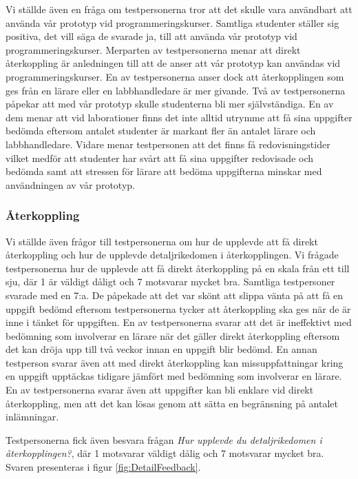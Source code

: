 \documentclass[a4paper,11pt]{article}
\begin{document}
{Vi ställde även en fråga om testpersonerna tror att det skulle vara användbart att använda vår prototyp vid programmeringskurser. Samtliga studenter ställer sig positiva, det vill säga de svarade ja, till att använda vår prototyp vid programmeringskurser. Merparten av testpersonerna menar att direkt återkoppling är anledningen till att de anser att vår prototyp kan användas vid programmeringskurser. En av testpersonerna anser dock att återkopplingen som ges från en lärare eller en labbhandledare är mer givande. Två av testpersonerna påpekar att med vår prototyp skulle studenterna bli mer självständiga. En av dem menar att vid laborationer finns det inte alltid utrymme att få sina uppgifter bedömda eftersom antalet studenter är markant fler än antalet lärare och labbhandledare. Vidare menar testpersonen att det finns få redovisningstider vilket medför att studenter har svårt att få sina uppgifter redovisade och bedömda samt att stressen för lärare att bedöma uppgifterna minskar med användningen av vår prototyp.

\subsubsection{Återkoppling}\label{Återkoppling}

Vi ställde även frågor till testpersonerna om hur de upplevde att få direkt återkoppling och hur de upplevde detaljrikedomen i återkopplingen. Vi frågade testpersonerna hur de upplevde att få direkt återkoppling på en skala från ett till sju, där 1 är väldigt dåligt och 7 motsvarar mycket bra.
Samtliga testpersoner svarade med en 7:a. De påpekade att det var skönt att slippa vänta på att få en uppgift bedömd eftersom testpersonerna tycker att återkoppling ska ges när de är inne i tänket för uppgiften. En av testpersonerna svarar att det är ineffektivt med bedömning som involverar en lärare när det gäller direkt återkoppling eftersom det kan dröja upp till två veckor innan en uppgift blir bedömd. En annan testperson svarar även att med direkt återkoppling kan missuppfattningar kring en uppgift upptäckas tidigare jämfört med bedömning som involverar en lärare. En av testpersonerna svarar även att uppgifter kan bli enklare vid direkt återkoppling, men att det kan lösas genom att sätta en begränsning på antalet inlämningar.

Testpersonerna fick även besvara frågan \textit{Hur upplevde du detaljrikedomen i återkopplingen?}, där 1 motsvarar väldigt dålig och 7 motsvarar mycket bra. Svaren presenteras i figur \ref{fig:DetailFeedback}.

}
\end{document}
